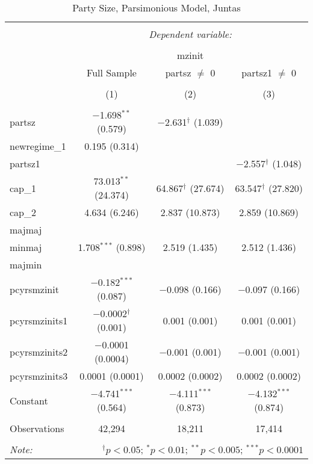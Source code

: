 
\begin{table}[!htbp] \centering 
  \caption{Party Size, Parsimonious Model, Juntas} 
  \label{} 
\begin{tabular}{@{\extracolsep{5pt}}lccc} 
\\[-1.8ex]\hline 
\hline \\[-1.8ex] 
 & \multicolumn{3}{c}{\textit{Dependent variable:}} \\ 
\cline{2-4} 
\\[-1.8ex] & \multicolumn{3}{c}{mzinit} \\ 
 & Full Sample & partsz $\neq$ 0 & partsz1 $\neq$ 0 \\ 
\\[-1.8ex] & (1) & (2) & (3)\\ 
\hline \\[-1.8ex] 
 partsz & $-$1.698$^{**}$ (0.579) & $-$2.631$^{\dagger}$ (1.039) &  \\ 
  newregime\_1 & 0.195 (0.314) &  &  \\ 
  partsz1 &  &  & $-$2.557$^{\dagger}$ (1.048) \\ 
  cap\_1 & 73.013$^{**}$ (24.374) & 64.867$^{\dagger}$ (27.674) & 63.547$^{\dagger}$ (27.820) \\ 
  cap\_2 & 4.634 (6.246) & 2.837 (10.873) & 2.859 (10.869) \\ 
  majmaj &  &  &  \\ 
  minmaj & 1.708$^{***}$ (0.898) & 2.519 (1.435) & 2.512 (1.436) \\ 
  majmin &  &  &  \\ 
  pcyrsmzinit & $-$0.182$^{***}$ (0.087) & $-$0.098 (0.166) & $-$0.097 (0.166) \\ 
  pcyrsmzinits1 & $-$0.0002$^{\dagger}$ (0.001) & 0.001 (0.001) & 0.001 (0.001) \\ 
  pcyrsmzinits2 & $-$0.0001 (0.0004) & $-$0.001 (0.001) & $-$0.001 (0.001) \\ 
  pcyrsmzinits3 & 0.0001 (0.0001) & 0.0002 (0.0002) & 0.0002 (0.0002) \\ 
  Constant & $-$4.741$^{***}$ (0.564) & $-$4.111$^{***}$ (0.873) & $-$4.132$^{***}$ (0.874) \\ 
 \hline \\[-1.8ex] 
Observations & 42,294 & 18,211 & 17,414 \\ 
\hline 
\hline \\[-1.8ex] 
\textit{Note:}  & \multicolumn{3}{r}{$^{\dagger} p<0.05$; $^{*} p<0.01$; $^{**} p<0.005$; $^{***} p<0.0001$} \\ 
\end{tabular} 
\end{table} 

